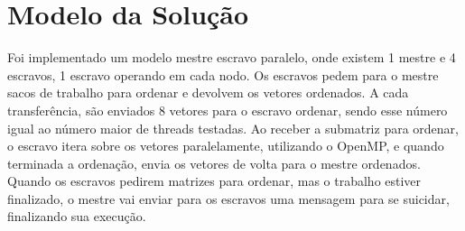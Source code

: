 \section{Modelo da Solução}

Foi implementado um modelo mestre escravo paralelo, onde existem 1 mestre e 4 escravos, 1 escravo operando em cada nodo. Os escravos pedem para o mestre sacos de trabalho para ordenar e devolvem os vetores ordenados. A cada transferência, são enviados 8 vetores para o escravo ordenar, sendo esse número igual ao número maior de threads testadas. Ao receber a submatriz para ordenar, o escravo itera sobre os vetores paralelamente, utilizando o OpenMP, e quando terminada a ordenação, envia os vetores de volta para o mestre ordenados. Quando os escravos pedirem matrizes para ordenar, mas o trabalho estiver finalizado, o mestre vai enviar para os escravos uma mensagem para se suicidar, finalizando sua execução.
